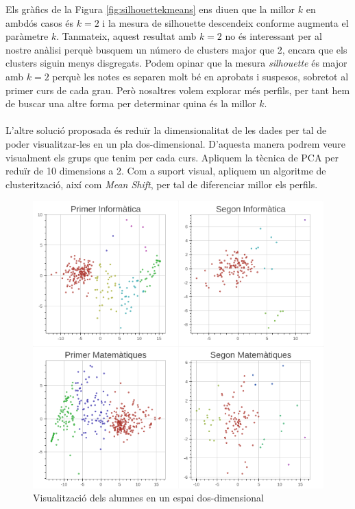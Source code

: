 \documentclass[12pt,a4paper,catalan]{article}
\begin{document}
Els gràfics de la Figura \ref{fig:silhouettekmeans} ens diuen que la millor $k$ en ambdós casos és $k=2$ i la mesura de silhouette descendeix conforme augmenta el paràmetre $k$. Tanmateix, aquest resultat amb $k=2$ no és interessant per al nostre anàlisi perquè busquem un número de clusters major que 2, encara que els clusters siguin menys disgregats. Podem opinar que la mesura \textit{silhouette} és major amb $k=2$ perquè les notes es separen molt bé en aprobats i suspesos, sobretot al primer curs de cada grau. Però nosaltres volem explorar més perfils, per tant hem de buscar una altre forma per determinar quina és la millor $k$.
\\
\\
L'altre solució proposada és reduïr la dimensionalitat de les dades per tal de poder visualitzar-les en un pla dos-dimensional. D'aquesta manera podrem veure visualment els grups que tenim per cada curs. Apliquem la tècnica de PCA per reduïr de 10 dimensions a 2. Com a suport visual, apliquem un algoritme de clusterització, així com \textit{Mean Shift}, per tal de diferenciar millor els perfils. 

\begin{figure}[h]
\centering
\includegraphics[width=.9\linewidth]{img/pca_info_mates.png}
\caption{Visualització dels alumnes en un espai dos-dimensional}
\label{fig:pca-meanshift}
\end{figure}

\newpage
\end{document}

